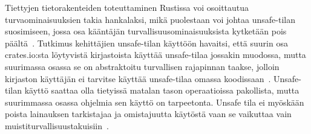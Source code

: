 Tiettyjen tietorakenteiden toteuttaminen Rustissa voi osoittautua turvaominaisuuksien takia hankalaksi, mikä puolestaan voi johtaa unsafe-tilan suosimiseen, jossa osa kääntäjän turvallisuusominaisuuksista kytketään pois päältä~\cite[chapter~19.1]{rustbook}. Tutkimus kehittäjien unsafe-tilan käyttöön havaitsi, että suurin osa crates.io:sta löytyvistä kirjastoista käyttää unsafe-tilaa jossakin muodossa, mutta suurimassa osassa se on abstraktoitu turvallisen rajapinnan taakse, jolloin kirjaston käyttäjän ei tarvitse käyttää unsafe-tilaa omassa koodissaan~\cite[p.~252]{unsafe}. Unsafe-tilan käyttö saattaa olla tietyissä matalan tason operaatioissa pakollista, mutta suurimmassa osassa ohjelmia sen käyttö on tarpeetonta. Unsafe tila ei myöskään poista lainauksen tarkistajaa ja omistajuutta käytöstä vaan se vaikuttaa vain muistiturvallisuustakuisiin~\cite[chapter~19.1]{rustbook}.